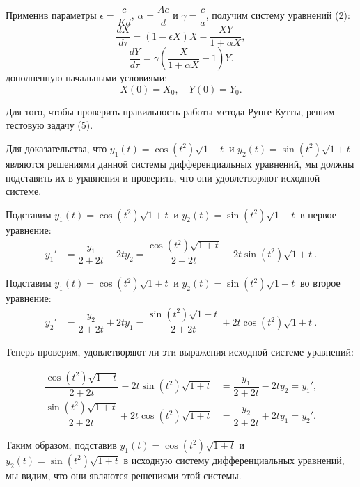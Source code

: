 \documentclass[a4paper,14pt]{extreport}
\begin{document}
    Применив параметры $\epsilon = \dfrac{c}{Kd}$, $\alpha = \dfrac{Ac}{d}$ и $\gamma = \dfrac{c}{a}$, получим систему уравнений (2):
    \begin{equation*}
    \dfrac{dX}{d\tau} = (1 - \epsilon X) X - \dfrac{XY}{1 + \alpha X},
    \end{equation*}
    \begin{equation*}
    \dfrac{dY}{d\tau} = \gamma \left(\dfrac{X}{1 + \alpha X} - 1\right) Y.
    \end{equation*}
    дополненную начальными условиями:
    \begin{equation*}
    X(0) = X_0, \quad Y(0) = Y_0.
    \end{equation*}

\par Для того, чтобы проверить правильность работы метода Рунге-Кутты, решим тестовую задачу (5).

Для доказательства, что $y_1(t) = \cos(t^2) \sqrt{1+t}$ и $y_2(t) = \sin(t^2) \sqrt{1+t}$ являются решениями данной системы дифференциальных уравнений, мы должны подставить их в уравнения и проверить, что они удовлетворяют исходной системе.

Подставим $y_1(t) = \cos(t^2) \sqrt{1+t}$ и $y_2(t) = \sin(t^2) \sqrt{1+t}$ в первое уравнение:
\begin{align*}
y_1' &= \dfrac{y_1}{2+2t} - 2ty_2 = \dfrac{\cos(t^2) \sqrt{1+t}}{2+2t} - 2t \sin(t^2) \sqrt{1+t}.
\end{align*}

Подставим $y_1(t) = \cos(t^2) \sqrt{1+t}$ и $y_2(t) = \sin(t^2) \sqrt{1+t}$ во второе уравнение:
\begin{align*}
y_2' &= \dfrac{y_2}{2+2t} + 2ty_1 = \dfrac{\sin(t^2) \sqrt{1+t}}{2+2t} + 2t \cos(t^2) \sqrt{1+t}.
\end{align*}

Теперь проверим, удовлетворяют ли эти выражения исходной системе уравнений:

\begin{align*}
\dfrac{\cos(t^2) \sqrt{1+t}}{2+2t} - 2t \sin(t^2) \sqrt{1+t} &= \dfrac{y_1}{2+2t} - 2ty_2 = y_1', \\
\dfrac{\sin(t^2) \sqrt{1+t}}{2+2t} + 2t \cos(t^2) \sqrt{1+t} &= \dfrac{y_2}{2+2t} + 2ty_1 = y_2'.
\end{align*}

Таким образом, подставив $y_1(t) = \cos(t^2) \sqrt{1+t}$ и $y_2(t) = \sin(t^2) \sqrt{1+t}$ в исходную систему дифференциальных уравнений, мы видим, что они являются решениями этой системы.
\end{document}
